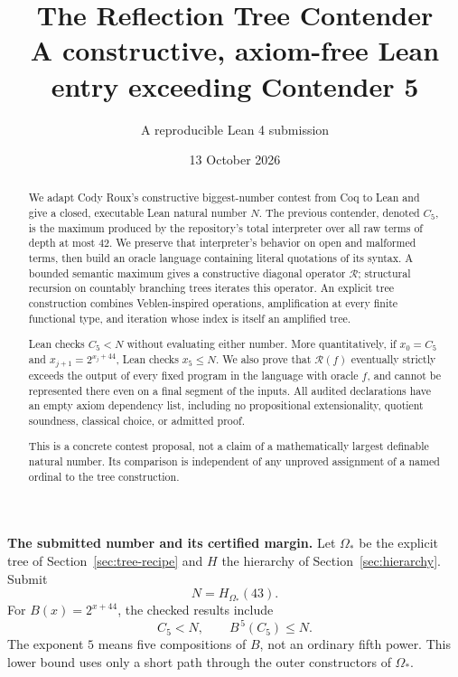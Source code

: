 \documentclass[11pt,letterpaper]{article}
\title{\color{accent}\Huge The Reflection Tree Contender\\[0.45em]
 \Large A constructive, axiom-free Lean entry exceeding Contender 5}
\author{A reproducible Lean 4 submission}
\date{13 October 2026}
\theoremstyle{definition}
\newcommand{\RF}{\mathcal R}
\begin{document}
\maketitle
\thispagestyle{empty}
\begin{abstract}
We adapt Cody Roux's constructive biggest-number contest from Coq to Lean and
give a closed, executable Lean natural number \(N\). The previous contender,
denoted \(C_5\), is the maximum produced by the repository's total interpreter
over all raw terms of depth at most \(42\). We preserve that interpreter's
behavior on open and malformed terms, then build an oracle language containing
literal quotations of its syntax. A bounded semantic maximum gives a
constructive diagonal operator \(\RF\); structural recursion on countably
branching trees iterates this operator. An explicit tree construction combines
Veblen-inspired operations, amplification at every finite functional type,
and iteration whose index is itself an amplified tree.

Lean checks \(C_5<N\) without evaluating either number. More quantitatively,
if \(x_0=C_5\) and \(x_{j+1}=2^{x_j+44}\), Lean checks \(x_5\le N\).
We also prove that \(\RF(f)\) eventually strictly exceeds the output of every
fixed program in the language with oracle \(f\), and cannot be represented
there even on a final segment of the inputs. All audited declarations have
an empty axiom dependency list, including no propositional extensionality,
quotient soundness, classical choice, or admitted proof.

This is a concrete contest proposal, not a claim of a mathematically largest
definable natural number. Its comparison is independent of any unproved
assignment of a named ordinal to the tree construction.
\end{abstract}
\begin{resultbox}
\textbf{The submitted number and its certified margin.}
Let \(\Omega_*\) be the explicit tree of Section~\ref{sec:tree-recipe}
and \(H\) the hierarchy of Section~\ref{sec:hierarchy}. Submit
\[
                    \boxed{N=H_{\Omega_*}(43).}
\]
For \(B(x)=2^{x+44}\), the checked results include
\[
             \boxed{C_5<N,\qquad B^{\,5}(C_5)\le N.}
\]
The exponent \(5\) means five compositions of \(B\), not an ordinary
fifth power. This lower bound uses only a short path through the outer
constructors of \(\Omega_*\).
\end{resultbox}
\clearpage
\begingroup
\small\setlength{\parskip}{0pt}
\tableofcontents
\endgroup
\clearpage
\end{document}
